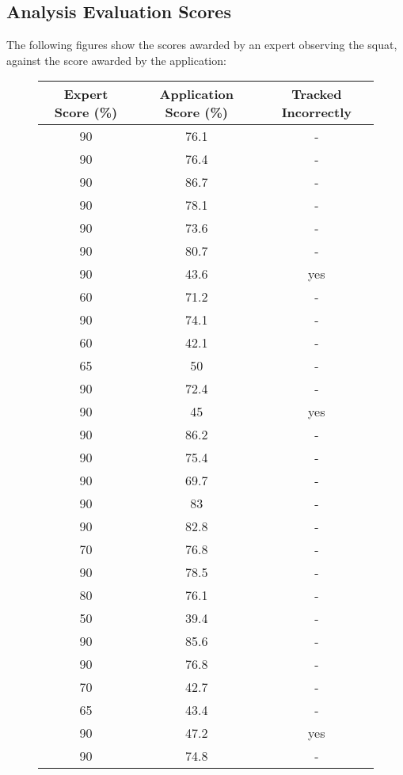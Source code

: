 \pagebreak
\subsection{Analysis Evaluation Scores}
\label{sec:analysis_eval_scores}

The following figures show the scores awarded by an expert observing the squat, against the score awarded by the application:

\begin{figure}[H]
    \centering
	\begin{tabular}{ | c | c | c | }
	    \hline
	    \textbf{Expert Score (\%)} & \textbf{Application Score (\%)} & \textbf{Tracked Incorrectly} \\ \hline
	    90 & 76.1 & - \\ \hline
		90 & 76.4 & - \\ \hline
		90 & 86.7 & - \\ \hline
		90 & 78.1 & - \\ \hline
		90 & 73.6 & - \\ \hline
		90 & 80.7 & - \\ \hline
		90 & 43.6 & yes \\ \hline
		60 & 71.2 & - \\ \hline
		90 & 74.1 & - \\ \hline
		60 & 42.1 & - \\ \hline
		65 & 50 & - \\ \hline
		90 & 72.4 & - \\ \hline
		90 & 45 & yes \\ \hline
		90 & 86.2 & - \\ \hline
		90 & 75.4 & - \\ \hline
		90 & 69.7 & - \\ \hline
		90 & 83 & - \\ \hline
		90 & 82.8 & - \\ \hline
		70 & 76.8 & - \\ \hline
		90 & 78.5 & - \\ \hline
		80 & 76.1 & - \\ \hline
		50 & 39.4 & - \\ \hline
		90 & 85.6 & - \\ \hline
		90 & 76.8 & - \\ \hline
		70 & 42.7 & - \\ \hline
		65 & 43.4 & - \\ \hline
		90 & 47.2 & yes \\ \hline
		90 & 74.8 & - \\ \hline

\end{tabular}
\end{figure}
